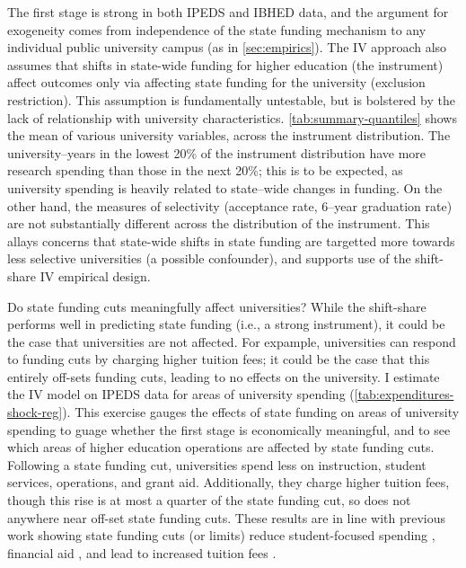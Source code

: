 The first stage is strong in both IPEDS and IBHED data, and the argument for exogeneity comes from independence of the state funding mechanism to any individual public university campus (as in \autoref{sec:empirics}).
The IV approach also assumes that shifts in state-wide funding for higher education (the instrument) affect outcomes only via affecting state funding for the university (exclusion restriction).
This assumption is fundamentally untestable, but is bolstered by the lack of relationship with university characteristics.
\autoref{tab:summary-quantiles} shows the mean of various university variables, across the instrument distribution.
The university--years in the lowest 20\% of the instrument distribution have more research spending than those in the next 20\%; this is to be expected, as university spending is heavily related to state--wide changes in funding.
On the other hand, the measures of selectivity (acceptance rate, 6--year graduation rate) are not substantially different across the distribution of the instrument.
This allays concerns that state-wide shifts in state funding are targetted more towards less selective universities (a possible confounder), and supports use of the shift-share IV empirical design.

Do state funding cuts meaningfully affect universities?
While the shift-share performs well in predicting state funding (i.e., a strong instrument), it could be the case that universities are not affected.
For expample, universities can respond to funding cuts by charging higher tuition fees; it could be the case that this entirely off-sets funding cuts, leading to no effects on the university.
I estimate the IV model on IPEDS data for areas of university spending  (\autoref{tab:expenditures-shock-reg}).
This exercise gauges the effects of state funding on areas of university spending to guage whether the first stage is economically meaningful, and to see which areas of higher education operations are affected by state funding cuts.
Following a state funding cut, universities spend less on instruction, student services, operations, and grant aid.
Additionally, they charge higher tuition fees, though this rise is at most a quarter of the state funding cut, so does not anywhere near off-set state funding cuts.
These results are in line with previous work showing state funding cuts (or limits) reduce student-focused spending \citep{NBERw23736}, financial aid \citep{miller2022making}, and lead to increased tuition fees \citep{bound2019public}.

